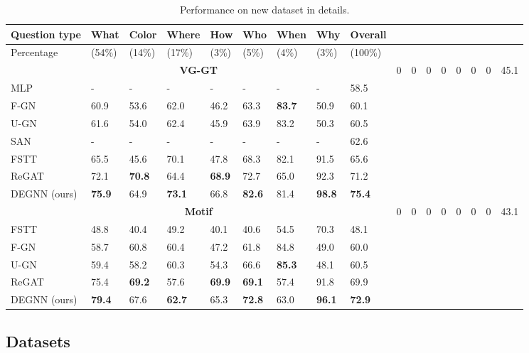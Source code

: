 \documentclass[letterpaper]{article} %
\begin{document}
\begin{table}[ht] 
\centering
    \begin{tabular}{l|lllllllll}
    \hline
    \textbf{Question type}&\textbf{What}&\textbf{Color}&\textbf{Where}&\textbf{How}&\textbf{Who}&\textbf{When}&\textbf{Why}&\textbf{Overall}\\
    \hline
     Percentage &(54\%) &(14\%) &(17\%) &(3\%) &(5\%) &(4\%) &(3\%) &(100\%)\\
    \hline
    \multicolumn{9}{c}{\bf VG-GT} \cr\hline %
     NSM &0 &0 &0 &0 &0 &0 &0 &45.1\\
     MLP &- &- &- &- &- &- &- &58.5\\
     F-GN &60.9 &53.6 &62.0 &46.2 &63.3 &\textbf{83.7} &50.9 &60.1\\
     U-GN &61.6 &54.0 &62.4 &45.9 &63.9 & 83.2 &50.3 &60.5\\
     SAN &- &- &- &- &- &- &- &62.6\\
     FSTT &65.5 &45.6 &70.1 &47.8 &68.3 &82.1 &91.5 &65.6\\
     ReGAT &72.1 &\textbf{70.8} &64.4 &\textbf{68.9} &72.7 &65.0 &92.3 &71.2\\
     DEGNN (ours) &\textbf{75.9} &64.9 &\textbf{73.1} &66.8 &\textbf{82.6} &81.4 &\textbf{98.8} &\textbf{75.4}\\
    \hline
     \multicolumn{9}{c}{\bf Motif} \cr\hline
     NSM &0 &0 &0 &0 &0 &0 &0 &43.1\\
     FSTT &48.8 &40.4 &49.2 &40.1 &40.6 &54.5 &70.3 &48.1\\
     F-GN &58.7 &60.8 &60.4 &47.2 &61.8 &84.8 &49.0 &60.0\\
     U-GN &59.4 &58.2 &60.3 &54.3 &66.6 &\textbf{85.3} &48.1 &60.5\\
     ReGAT &75.4 &\textbf{69.2} &57.6 &\textbf{69.9} &\textbf{69.1} &57.4 &91.8 &69.9\\
     DEGNN (ours) &\textbf{79.4} &67.6 &\textbf{62.7} &65.3 &\textbf{72.8} &63.0 &\textbf{96.1} &\textbf{72.9}\\
    \hline
    \end{tabular}
\caption{\label{new-detail}
Performance on new dataset in details.
}
\end{table}


\subsection{Datasets}
\end{document}
